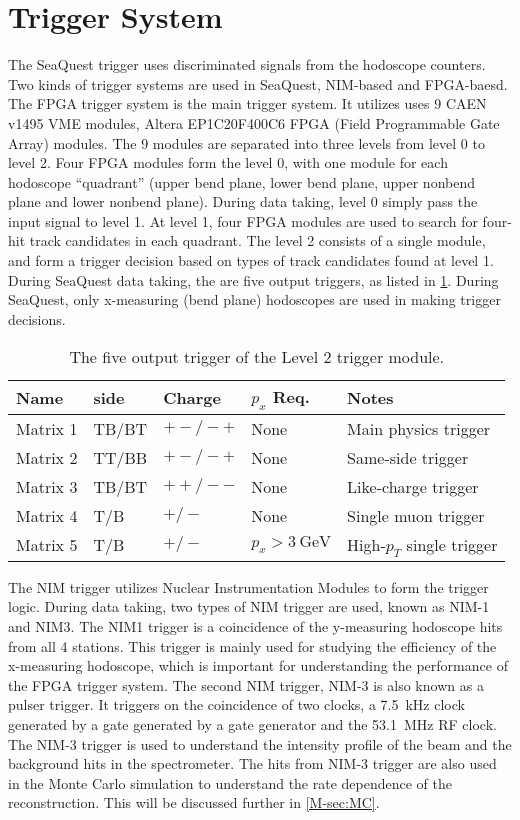 \documentclass[../main.tex]{subfiles}
\begin{document}
\section{Trigger System}
The SeaQuest trigger uses discriminated signals from the hodoscope counters.
Two kinds of trigger systems are used in SeaQuest, NIM-based and FPGA-baesd.
The FPGA trigger system is the main trigger system. It utilizes uses 9 CAEN
v1495 VME modules, Altera EP1C20F400C6 FPGA (Field Programmable Gate Array)
modules. The 9 modules are separated into three levels from level 0 to level
2. Four FPGA modules form the level 0, with one module for each hodoscope
``quadrant'' (upper bend plane, lower bend plane, upper nonbend plane and
lower nonbend plane). During data taking, level 0 simply pass the input signal
to level 1. At level 1, four FPGA modules are used to search for four-hit track
candidates in each quadrant. The level 2 consists of a single module, and form
a trigger decision based on types of track candidates found at level 1. During
SeaQuest data taking, the are five output triggers, as listed in \cref{tab:FPGA}.
During SeaQuest, only x-measuring (bend plane) hodoscopes are used in making
trigger decisions.
\begin{table}[h!]
\centering
\caption{The five output trigger of the Level 2 trigger module.}
\label{tab:FPGA}
\begin{tabular}{lllll}
Name     & side  & Charge  & $p_x$ Req. & Notes                \\ \hline
Matrix 1 & TB/BT & $+-/-+$ & None       & Main physics trigger \\
Matrix 2 & TT/BB & $+-/-+$ & None       & Same-side trigger \\
Matrix 3 & TB/BT & $++/--$ & None       & Like-charge trigger \\
Matrix 4 & T/B & $+/-$ & None       & Single muon trigger \\
Matrix 5 & T/B & $+/-$ & $p_x>\SI{3}{\GeV}$       & High-$p_T$ single trigger                 
\end{tabular}
\end{table}


The NIM trigger utilizes Nuclear Instrumentation Modules to form the trigger
logic. During data taking, two types of NIM trigger are used, known as NIM-1
and NIM3. The NIM1 trigger is a coincidence of the y-measuring hodoscope hits
from all 4 stations. This trigger is mainly used for studying the efficiency
of the x-measuring hodoscope, which is important for understanding the performance
of the FPGA trigger system. The second NIM trigger, NIM-3 is also known as a
pulser trigger. It triggers on the coincidence of two clocks, a \SI{7.5}{\kHz}
clock generated by a gate generated by a gate generator and the \SI{53.1}{\MHz}
RF clock. The NIM-3 trigger is used to understand the intensity profile of the
beam and the background hits in the spectrometer. The hits from NIM-3 trigger
are also used in the Monte Carlo simulation to understand the rate dependence
of the reconstruction. This will be discussed further in \cref{M-sec:MC}.


\ifSubfilesClassLoaded{ \printbibliography[heading=bibintoc,title={References}]}{}
\end{document}
